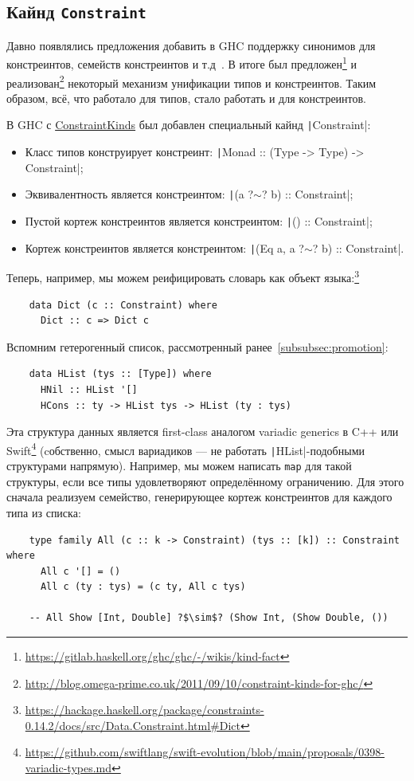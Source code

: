 \subsection{Кайнд \texttt{Constraint}}

Давно появлялись предложения добавить в GHC поддержку синонимов для констреинтов, семейств констреинтов и т.д~\cite{orchard2010haskell}.
В итоге был предложен\footnote{\url{https://gitlab.haskell.org/ghc/ghc/-/wikis/kind-fact}} и реализован\footnote{\url{http://blog.omega-prime.co.uk/2011/09/10/constraint-kinds-for-ghc/}} некоторый механизм унификации типов и констреинтов.
Таким образом, всё, что работало для типов, стало работать и для констреинтов.

В GHC с \href{https://downloads.haskell.org/ghc/9.2-latest/docs/html/users_guide/exts/constraint_kind.html}{ConstraintKinds} был добавлен специальный кайнд \texttt|Constraint|:
\begin{itemize}
    \item Класс типов конструирует констреинт: \texttt|Monad :: (Type -> Type) -> Constraint|;
    \item Эквивалентность является констреинтом: \texttt|(a ?$\sim$? b) :: Constraint|;
    \item Пустой кортеж констреинтов является констреинтом: \texttt|() :: Constraint|;
    \item Кортеж констреинтов является констреинтом: \texttt|(Eq a, a ?$\sim$? b) :: Constraint|.
\end{itemize}

Теперь, например, мы можем реифицировать словарь как объект языка:\footnote{\url{https://hackage.haskell.org/package/constraints-0.14.2/docs/src/Data.Constraint.html\#Dict}}
\begin{verbatim}
    data Dict (c :: Constraint) where
      Dict :: c => Dict c
\end{verbatim}

Вспомним гетерогенный список, рассмотренный ранее~\ref{subsubsec:promotion}:
\begin{verbatim}
    data HList (tys :: [Type]) where
      HNil :: HList '[]
      HCons :: ty -> HList tys -> HList (ty : tys)
\end{verbatim}
Эта структура данных является first-class аналогом variadic generics в C++ или Swift\footnote{\url{https://github.com/swiftlang/swift-evolution/blob/main/proposals/0398-variadic-types.md}} (cобственно, смысл вариадиков --- не работать \texttt|HList|-подобными структурами напрямую).
Например, мы можем написать \texttt{map} для такой структуры, если все типы удовлетворяют определённому ограничению.
Для этого сначала реализуем семейство, генерирующее кортеж констреинтов для каждого типа из списка:
\begin{verbatim}
    type family All (c :: k -> Constraint) (tys :: [k]) :: Constraint where
      All c '[] = ()
      All c (ty : tys) = (c ty, All c tys)

    -- All Show [Int, Double] ?$\sim$? (Show Int, (Show Double, ())
\end{verbatim}

